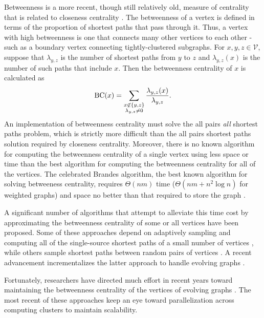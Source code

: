 \documentclass{report}
\begin{document}
Betweenness is a more recent, though still relatively old, measure of centrality that is related to closeness centrality \cite{freeman1977set}. 
The betweenness of a vertex is defined in terms of the proportion of shortest paths that pass through it.
Thus, a vertex with high betweenness is one that connects many other vertices to each other - such as a boundary vertex connecting tightly-clustered subgraphs.
For $x,y, z \in \mathcal{V}$, suppose that $\lambda_{y,z}$ is the number of shortest paths from $y$ to $z$ and $\lambda_{y,z}(x)$ is the number of such paths that include $x$. 
Then the betweenness centrality of $x$ is calculated as
%
\begin{equation} \label{eq:bc}
\textnormal{BC}(x) = \sum\limits_{\substack{x \not\in \{y,z\} \\ \lambda_{y,z} \neq 0}} \frac{\lambda_{y,z}(x)}{\lambda_{y,z}}.
\end{equation}
%
An implementation of betweenness centrality must solve the all pairs \emph{all} shortest paths problem, which is strictly more difficult than the all pairs shortest paths solution required by closeness centrality.
Moreover, there is no known algorithm for computing the betweenness centrality of a single vertex using less space or time than the best algorithm for computing the betweenness centrality for all of the vertices. 
The celebrated Brandes algorithm, the best known algorithm for solving betweeness centrality, requires $\Theta(nm)$ time ($\Theta(nm + n^2\log n)$ for weighted graphs) and space no better than that required to store the graph  \cite{brandes2001faster}. 

A significant number of algorithms that attempt to alleviate this time cost by approximating the betweenness centrality of some or all vertices have been proposed. 
Some of these approaches depend on adaptively sampling and computing all of the single-source shortest paths of a small number of vertices \cite{bader2007approximating,brandes2007centrality}, while others sample shortest paths between random pairs of vertices \cite{riondato2016fast}. 
A recent advancement incrementalizes the latter approach to handle evolving graphs \cite{bergamini2014approximating}.

Fortunately, researchers have directed much effort in recent years toward maintaining the betweenness centrality of the vertices of evolving graphs \cite{green2012fast, wei2014real, kourtellis2015scalable}. 
The most recent of these approaches keep an eye toward parallelization across computing clusters to maintain scalability.
\end{document}
